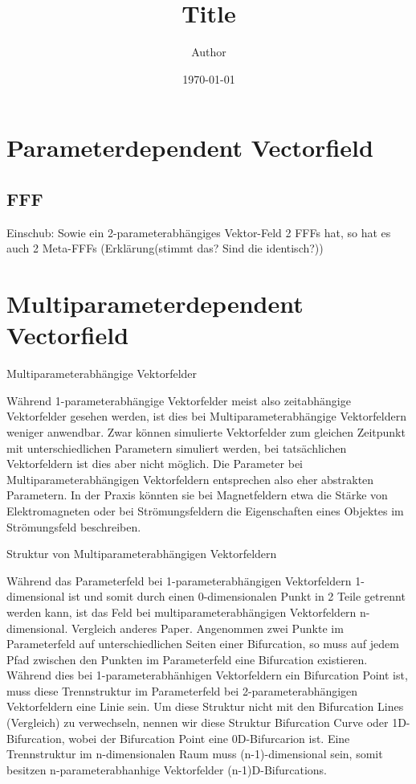 \documentclass[11pt]{article}
\title{ Title}
\author{ Author }
\date{\today}
\begin{document}
\maketitle	
\pagebreak

\section{Parameterdependent Vectorfield}
\subsection{FFF}
Einschub:
Sowie ein 2-parameterabhängiges Vektor-Feld 2 FFFs hat, so hat es auch 2 Meta-FFFs (Erklärung(stimmt das? Sind die identisch?))

\section{Multiparameterdependent Vectorfield}
Multiparameterabhängige Vektorfelder

Während 1-parameterabhängige Vektorfelder meist also zeitabhängige Vektorfelder gesehen werden, ist dies bei Multiparameterabhängige Vektorfeldern weniger anwendbar. Zwar können simulierte Vektorfelder zum gleichen Zeitpunkt mit unterschiedlichen Parametern simuliert werden, bei tatsächlichen Vektorfeldern ist dies aber nicht möglich. Die Parameter bei Multiparameterabhängigen Vektorfeldern entsprechen also eher abstrakten Parametern. In der Praxis könnten sie bei Magnetfeldern etwa die Stärke von Elektromagneten oder bei Strömungsfeldern die Eigenschaften eines Objektes im Strömungsfeld beschreiben.

Struktur von Multiparameterabhängigen Vektorfeldern

Während das Parameterfeld bei 1-parameterabhängigen Vektorfeldern 1-dimensional ist und somit durch einen 0-dimensionalen Punkt in 2 Teile getrennt werden kann, ist das Feld bei multiparameterabhängigen Vektorfeldern n-dimensional.
Vergleich anderes Paper.
Angenommen zwei Punkte im Parameterfeld auf unterschiedlichen Seiten einer Bifurcation, so muss auf jedem Pfad zwischen den Punkten im Parameterfeld eine Bifurcation existieren. Während dies bei 1-parameterabhänhigen Vektorfeldern ein Bifurcation Point ist, muss diese Trennstruktur im Parameterfeld bei 2-parameterabhängigen Vektorfeldern eine Linie sein. Um diese Struktur nicht mit den Bifurcation Lines (Vergleich) zu verwechseln, nennen wir diese Struktur Bifurcation Curve oder 1D-Bifurcation, wobei der Bifurcation Point eine 0D-Bifurcarion ist.
Eine Trennstruktur im n-dimensionalen Raum muss (n-1)-dimensional sein, somit besitzen n-parameterabhanhige Vektorfelder (n-1)D-Bifurcations.
\end{document}
